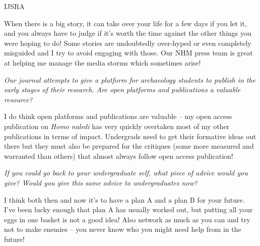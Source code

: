 \begin{labeling}{IJSRA}
\item[CS]
When there is a big story, it can take over your life for a few days if you let it,
and you always have to judge if it’s worth the time against the other things you were hoping to do!
Some stories are undoubtedly over-hyped or even completely misguided and I try to avoid engaging with those.
Our NHM press team is great at helping me manage the media storms which sometimes arise!

\item[IJSRA]
\emph{Our journal attempts to give a platform for archaeology students to publish in the early stages of their research.
Are open platforms and publications a valuable resource?}

\item[CS]
I do think open platforms and publications are valuable – my open access publication on \emph{Homo naledi} has
very quickly overtaken most of my other publications in terms of impact.
Undergrads need to get their formative ideas out there but they must also be prepared for the critiques
(some more measured and warranted than others) that almost always follow open access publication!

\item[IJSRA]
\emph{If you could go back to your undergraduate self, what piece of advice would you give?
Would you give this same advice to undergraduates now?}

\item[CS]
I think both then and now it’s to have a plan A and a plan B for your future.
I’ve been lucky enough that plan A has usually worked out, but putting all your eggs in one basket is not a good idea!
Also network as much as you can and try not to make enemies – you never know who you might need help from in the future!

\end{labeling}
\IJSRAclosingclean
%
